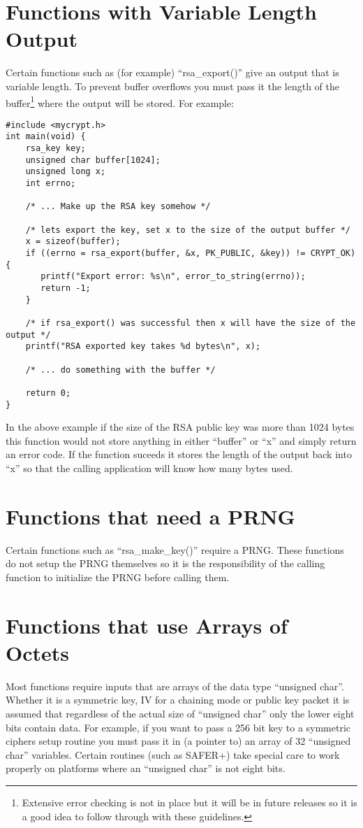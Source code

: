 \documentclass{book}
\begin{document}
\section{Functions with Variable Length Output}
Certain functions such as (for example) ``rsa\_export()'' give an output that is variable length.  To prevent buffer overflows you
must pass it the length of the buffer\footnote{Extensive error checking is not in place but it will be in future releases so it is a good idea to follow through with these guidelines.} where
the output will be stored.  For example:
\begin{small}
\begin{verbatim}
#include <mycrypt.h>
int main(void) {
    rsa_key key;
    unsigned char buffer[1024];
    unsigned long x;
    int errno;

    /* ... Make up the RSA key somehow */

    /* lets export the key, set x to the size of the output buffer */
    x = sizeof(buffer);
    if ((errno = rsa_export(buffer, &x, PK_PUBLIC, &key)) != CRYPT_OK) {
       printf("Export error: %s\n", error_to_string(errno));
       return -1;
    }
    
    /* if rsa_export() was successful then x will have the size of the output */
    printf("RSA exported key takes %d bytes\n", x);

    /* ... do something with the buffer */

    return 0;
}
\end{verbatim}
\end{small}
In the above example if the size of the RSA public key was more than 1024 bytes this function would not store anything in
either ``buffer'' or ``x'' and simply return an error code.  If the function suceeds it stores the length of the output
back into ``x'' so that the calling application will know how many bytes used.

\section{Functions that need a PRNG}
Certain functions such as ``rsa\_make\_key()'' require a PRNG.  These functions do not setup the PRNG themselves so it is 
the responsibility of the calling function to initialize the PRNG before calling them.

\section{Functions that use Arrays of Octets}
Most functions require inputs that are arrays of the data type ``unsigned char''.  Whether it is a symmetric key, IV
for a chaining mode or public key packet it is assumed that regardless of the actual size of ``unsigned char'' only the
lower eight bits contain data.  For example, if you want to pass a 256 bit key to a symmetric ciphers setup routine
you must pass it in (a pointer to) an array of 32 ``unsigned char'' variables.  Certain routines 
(such as SAFER+) take special care to work properly on platforms where an ``unsigned char'' is not eight bits.
\end{document}
